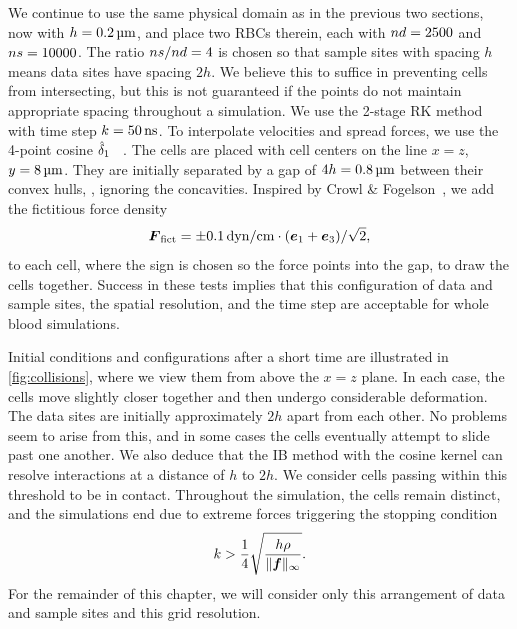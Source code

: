 We continue to use the same physical domain as in the previous two sections, now with $h = 0.2\um$, and place two
RBCs therein, each with $\data\cardinality=2500$ and $\sample\cardinality=10000$. The ratio
$\sample\cardinality/\data\cardinality=4$ is chosen so that sample sites with spacing $h$ means data sites have
spacing $2h$. We believe this to suffice in preventing cells from intersecting, but this is not guaranteed if the
points do not maintain appropriate spacing throughout a simulation. We use the 2-stage RK method with time step
$\timestep = 50\ns$. To interpolate velocities and spread forces, we use the 4-point cosine $\hat{\delta}_1$~%
\cite{Peskin:2002go}. The cells are placed with cell centers on the line $x = z$, $y = 8\um$. They are initially
separated by a gap of $4h = 0.8\um$ between their convex hulls, , ignoring the concavities. Inspired
by Crowl \& Fogelson~\cite{Erickson:2011cf}, we add the fictitious force density
\begin{equation}
    \F_\text{fict} = \pm 0.1\dynpercm\cdot(\e_1+\e_3)/\sqrt{2},
\end{equation}
to each cell, where the sign is chosen so the force points into the gap, to draw the cells together. Success in
these tests implies that this configuration of data and sample sites, the spatial resolution, and the time step
are acceptable for whole blood simulations.

Initial conditions and configurations after a short time are illustrated in \cref{fig:collisions}, where we view
them from above the $x=z$ plane. In each case, the cells move slightly closer together and then undergo
considerable deformation. The data sites are initially approximately $2h$ apart from each other. No problems seem
to arise from this, and in some cases the cells eventually attempt to slide past one another.  We also deduce that
the IB method with the cosine kernel can resolve interactions at a distance of $h$ to $2h$. We consider cells
passing within this threshold to be in contact. Throughout the simulation, the cells remain distinct, and the
simulations end due to extreme forces triggering the stopping condition~\cite{Agresar:1998wv}
\begin{equation}
    k > \frac14\sqrt{\frac{h\rho}{\|\boldsymbol{f}\|_\infty}}.
\end{equation}
For the remainder of this chapter, we will consider only this arrangement of data and sample sites and this grid
resolution.
